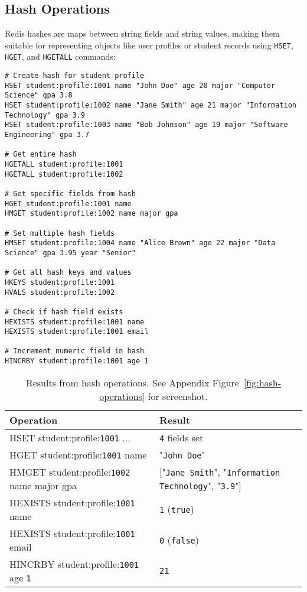 \subsection{Hash Operations}

Redis hashes are maps between string fields and string values, making them suitable for representing objects like user profiles or student records using \texttt{HSET}, \texttt{HGET}, and \texttt{HGETALL} commands:

\begin{verbatim}
# Create hash for student profile
HSET student:profile:1001 name "John Doe" age 20 major "Computer Science" gpa 3.8
HSET student:profile:1002 name "Jane Smith" age 21 major "Information Technology" gpa 3.9
HSET student:profile:1003 name "Bob Johnson" age 19 major "Software Engineering" gpa 3.7

# Get entire hash
HGETALL student:profile:1001
HGETALL student:profile:1002

# Get specific fields from hash
HGET student:profile:1001 name
HMGET student:profile:1002 name major gpa

# Set multiple hash fields
HMSET student:profile:1004 name "Alice Brown" age 22 major "Data Science" gpa 3.95 year "Senior"

# Get all hash keys and values
HKEYS student:profile:1001
HVALS student:profile:1002

# Check if hash field exists
HEXISTS student:profile:1001 name
HEXISTS student:profile:1001 email

# Increment numeric field in hash
HINCRBY student:profile:1001 age 1
\end{verbatim}

\begin{table}[H]
  \centering
  \begin{tabular}{|l|l|}
    \hline
    \textbf{Operation} & \textbf{Result} \\
    \hline
    HSET student:profile:\texttt{1001} ... & \texttt{4} fields set \\
    HGET student:profile:\texttt{1001} name & "\texttt{John Doe}" \\
    HMGET student:profile:\texttt{1002} name major gpa & ["\texttt{Jane Smith}", "\texttt{Information Technology}", "\texttt{3.9}"] \\
    HEXISTS student:profile:\texttt{1001} name & \texttt{1} (\texttt{true}) \\
    HEXISTS student:profile:\texttt{1001} email & \texttt{0} (\texttt{false}) \\
    HINCRBY student:profile:\texttt{1001} age \texttt{1} & \texttt{21} \\
    \hline
  \end{tabular}
  \caption{Results from hash operations. See Appendix Figure~\ref{fig:hash-operations} for screenshot.}
\end{table}

